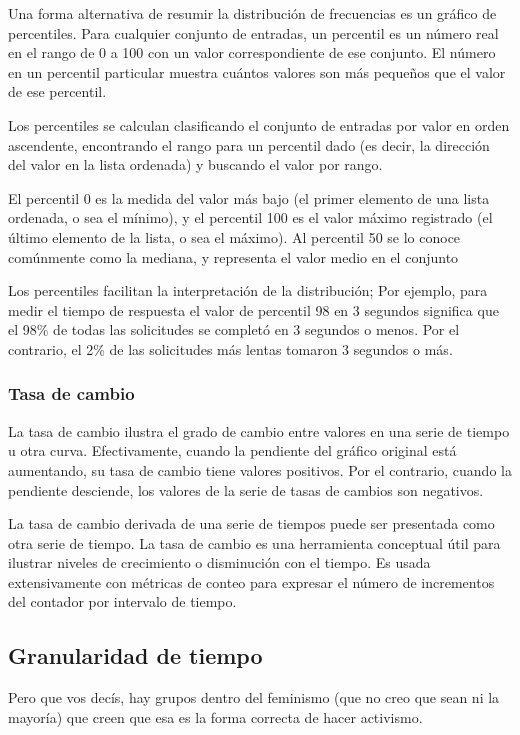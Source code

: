 Una forma alternativa de resumir la distribución de frecuencias es un gráfico
de percentiles. Para cualquier conjunto de entradas, un percentil es un número
real en el rango de 0 a 100 con un valor correspondiente de ese conjunto. El
número en un percentil particular muestra cuántos valores son más pequeños que
el valor de ese percentil.

Los percentiles se calculan clasificando el conjunto de entradas por valor en
orden ascendente, encontrando el rango para un percentil dado (es decir, la
dirección del valor en la lista ordenada) y buscando el valor por rango.

El percentil 0 es la medida del valor más bajo (el primer elemento de una lista
ordenada, o sea el mínimo), y el percentil 100 es el valor máximo registrado
(el último elemento de la lista, o sea el máximo). Al percentil 50 se lo conoce
comúnmente como la mediana, y representa el valor medio en el conjunto

Los percentiles facilitan la interpretación de la distribución; Por ejemplo,
para medir el tiempo de respuesta el valor de percentil 98 en 3 segundos
significa que el 98\% de todas las solicitudes se completó en 3 segundos o
menos. Por el contrario, el 2\% de las solicitudes más lentas tomaron 3
segundos o más.

\subsubsection*{Tasa de cambio}
\label{tasa_de_cambio}

La tasa de cambio ilustra el grado de cambio entre valores en una serie de
tiempo u otra curva. Efectivamente, cuando la pendiente del gráfico original
está aumentando, su tasa de cambio tiene valores positivos. Por el contrario,
cuando la pendiente desciende, los valores de la serie de tasas de cambios son
negativos.

La tasa de cambio derivada de una serie de tiempos puede ser presentada como
otra serie de tiempo. La tasa de cambio es una herramienta conceptual útil para
ilustrar niveles de crecimiento o disminución con el tiempo. Es usada
extensivamente con métricas de conteo para expresar el número de incrementos
del contador por intervalo de tiempo.


\subsection*{Granularidad de tiempo}

Pero que vos decís, hay grupos dentro del feminismo (que no creo que sean ni la mayoría)  que creen que esa es la forma correcta de hacer activismo.
\label{granularidad_de_tiempo}


